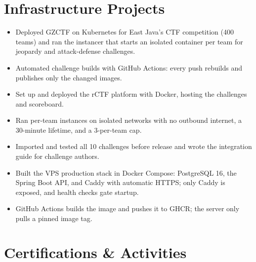 \section{Infrastructure Projects}

\begin{itemize}
    \item Deployed GZCTF on Kubernetes for East Java's CTF competition (400 teams) and ran the instancer that starts an isolated container per team for jeopardy and attack-defense challenges.
    \item Automated challenge builds with GitHub Actions: every push rebuilds and publishes only the changed images.
\end{itemize}

\vspace{2pt}

\begin{itemize}
    \item Set up and deployed the rCTF platform with Docker, hosting the challenges and scoreboard.
    \item Ran per-team instances on isolated networks with no outbound internet, a 30-minute lifetime, and a 3-per-team cap.
    \item Imported and tested all 10 challenges before release and wrote the integration guide for challenge authors.
\end{itemize}

\vspace{2pt}

\begin{itemize}
    \item Built the VPS production stack in Docker Compose: PostgreSQL 16, the Spring Boot API, and Caddy with automatic HTTPS; only Caddy is exposed, and health checks gate startup.
    \item GitHub Actions builds the image and pushes it to GHCR; the server only pulls a pinned image tag.
\end{itemize}

\section{Certifications \& Activities}

